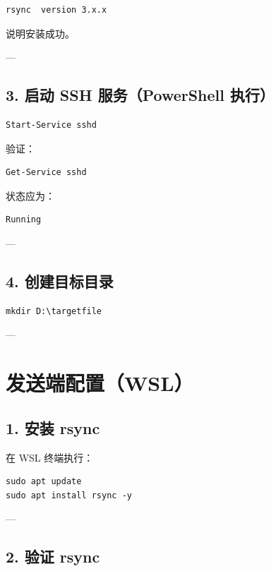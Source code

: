 \documentclass[UTF8]{ctexart}
\begin{document}
\begin{lstlisting}
rsync  version 3.x.x
\end{lstlisting}

说明安装成功。

---

\subsection{3. 启动 SSH 服务（PowerShell 执行）}

\begin{lstlisting}
Start-Service sshd
\end{lstlisting}

验证：

\begin{lstlisting}
Get-Service sshd
\end{lstlisting}

状态应为：

\begin{lstlisting}
Running
\end{lstlisting}

---

\subsection{4. 创建目标目录}

\begin{lstlisting}
mkdir D:\targetfile
\end{lstlisting}

---

\section{发送端配置（WSL）}

\subsection{1. 安装 rsync}

在 WSL 终端执行：

\begin{lstlisting}
sudo apt update
sudo apt install rsync -y
\end{lstlisting}

---

\subsection{2. 验证 rsync}
\end{document}
